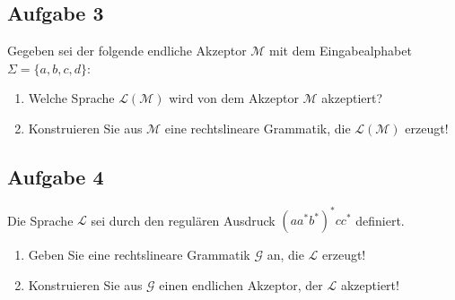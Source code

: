 \documentclass[10pt,oneside,onecolumn,a4paper,german,titlepage]{article}
\begin{document}
\subsection*{Aufgabe 3}
Gegeben sei der folgende endliche Akzeptor $\mathcal{M}$ mit dem Eingabealphabet
$\Sigma = \{a,b,c,d\}$:
\begin{center}
\end{center}
\begin{enumerate}
\item Welche Sprache $\mathcal{L}(\mathcal{M})$ wird von dem Akzeptor $\mathcal{M}$
akzeptiert?
\item Konstruieren Sie aus $\mathcal{M}$ eine rechtslineare Grammatik, die
$\mathcal{L}(\mathcal{M})$ erzeugt!
\end{enumerate}

\subsection*{Aufgabe 4}
Die Sprache $\mathcal{L}$ sei durch den regulären Ausdruck $(aa^*b^*)^*cc^*$
definiert.
\begin{enumerate}
\item Geben Sie eine rechtslineare Grammatik $\mathcal{G}$ an, die $\mathcal{L}$
erzeugt!
\item Konstruieren Sie aus $\mathcal{G}$ einen endlichen Akzeptor, der $\mathcal{L}$
akzeptiert!
\end{enumerate}

\newpage
\end{document}
